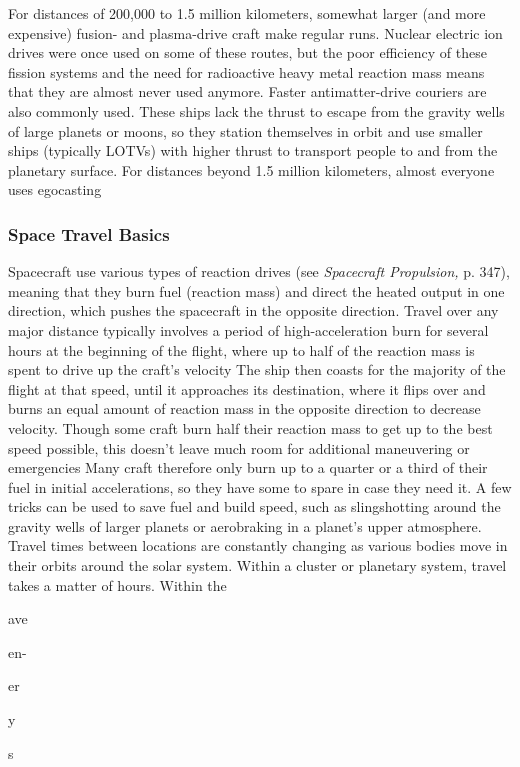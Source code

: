 For distances of 200,000 to 1.5 million kilometers, 
somewhat larger (and more expensive) fusion- and 
plasma-drive craft make regular runs. Nuclear electric 
ion drives were once used on some of these routes, 
but the poor efficiency of these fission systems and the 
need for radioactive heavy metal reaction mass means 
that they are almost never used anymore. Faster antimatter-drive
couriers are also commonly used. These
ships lack the thrust to escape from the gravity wells 
of large planets or moons, so they station themselves 
in orbit and use smaller ships (typically LOTVs) with 
higher thrust to transport people to and from the 
planetary surface.
For distances beyond 1.5 million kilometers, almost 
everyone uses egocasting

\subsubsection{Space Travel Basics}

Spacecraft use various types of reaction drives (see 
\textit{Spacecraft Propulsion,} p. 347), meaning that they burn 
fuel (reaction mass) and direct the heated output in 
one direction, which pushes the spacecraft in the opposite
direction. Travel over any major distance typically
involves a period of high-acceleration burn for several 
hours at the beginning of the flight, where up to half of 
the reaction mass is spent to drive up the craft's velocity
The ship then coasts for the majority of the flight at
that speed, until it approaches its destination, where it 
flips over and burns an equal amount of reaction mass 
in the opposite direction to decrease velocity.
Though some craft burn half their reaction mass 
to get up to the best speed possible, this doesn't leave 
much room for additional maneuvering or emergencies
Many craft therefore only burn up to a quarter
or a third of their fuel in initial accelerations, so they 
have some to spare in case they need it. A few tricks 
can be used to save fuel and build speed, such as slingshotting
around the gravity wells of larger planets or
aerobraking in a planet's upper atmosphere.
Travel times between locations are constantly 
changing as various bodies move in their orbits 
around the solar system. Within a cluster or planetary 
system, travel takes a matter of hours. Within the 

ave

en-

er

y

s 


